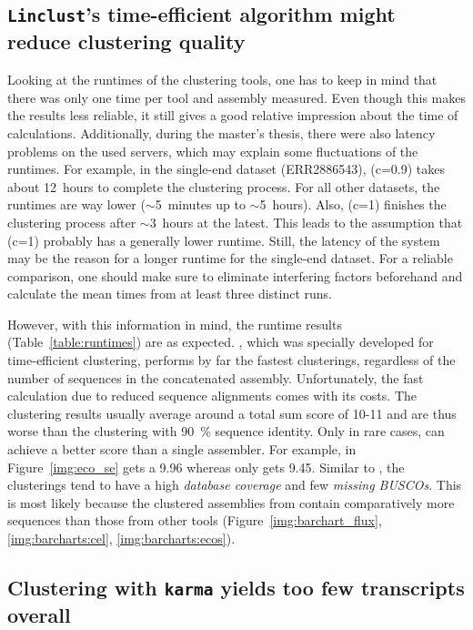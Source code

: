 \documentclass[12pt,a4paper,english]{article}
\begin{document}
	\subsection{\texttt{Linclust}'s time-efficient algorithm might reduce clustering quality}
	    Looking at the runtimes of the clustering tools, one has to keep in mind that there was only one time per tool and assembly measured. Even though this makes the results less reliable, it still gives a good relative impression about the time of calculations.
		Additionally, during the master's thesis, there were also latency problems on the used servers, which may explain some fluctuations of the runtimes.
		For example, in the single-end \celegans dataset (ERR2886543), \cdhit (c=0.9) takes about 12~hours to complete the clustering process. For all other datasets, the runtimes are way lower ($\sim$5~minutes up to $\sim$5~hours). Also, \cdhit (c=1) finishes the clustering process after $\sim$3~hours at the latest. This leads to the assumption that \cdhit (c=1) probably has a generally lower runtime. Still, the latency of the system may be the reason for a longer runtime for the single-end \celegans dataset.    
		For a reliable comparison, one should make sure to eliminate interfering factors beforehand and calculate the mean times from at least three distinct runs.
		
		However, with this information in mind, the runtime results (Table~\ref{table:runtimes}) are as expected. \linclust, which was specially developed for time-efficient clustering, performs by far the fastest clusterings, regardless of the number of sequences in the concatenated assembly.
		Unfortunately, the fast calculation due to reduced sequence alignments comes with its costs.
		The clustering results usually average around a total sum score of 10-11 and are thus worse than the \cdhit clustering with 90~\% sequence identity.
		Only in rare cases, \linclust can achieve a better score than a single assembler. For example, in Figure~\ref{img:eco_se} \linclust gets a 9.96 whereas \spades only gets 9.45. Similar to \cdhit, the clusterings tend to have a high \textit{database coverage} and few \textit{missing BUSCOs}. This is most likely because the clustered assemblies from \linclust contain comparatively more sequences than those from other tools (Figure~\ref{img:barchart_flux}, \ref{img:barcharts:cel}, \ref{img:barcharts:ecos}).
		
	\subsection{Clustering with \texttt{karma} yields too few transcripts overall}
\end{document}
